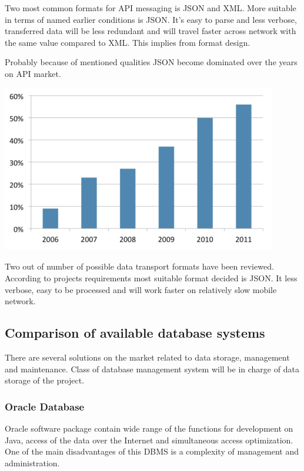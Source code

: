 \documentclass[thesis=M,english]{FITthesis}[2012/10/20]
\begin{document}
Two most common formats for API messaging is JSON and XML.
More suitable in terms of named earlier conditions is JSON. It's easy to parse and less verbose, transferred data will be less redundant and will travel faster across network with the same value compared to XML. This implies from format design.

Probably because of mentioned qualities JSON become dominated over the years on API market.

\begin{center}
\includegraphics[width=0.9\textwidth]{images/json_support}
\end{center}

Two out of number of possible data transport formats have been reviewed. According to projects requirements most suitable format decided is JSON. It less verbose, easy to be processed and will work faster on relatively slow mobile network.

\subsection{Comparison of available database systems}

There are several solutions on the market related to data storage, management and maintenance. Class of database management system will be in charge of data storage of the project.

\subsubsection{Oracle Database}

Oracle software package contain wide range of the functions for development on Java, access of the data over the Internet and simultaneous access optimization. One of the main disadvantages of this DBMS is a complexity of management and administration.
\end{document}
